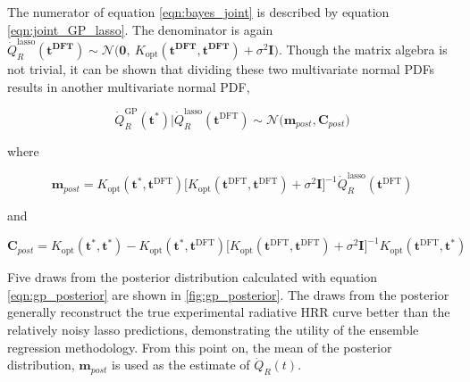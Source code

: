 \documentclass{article}
\begin{document}
The numerator of equation \ref{eqn:bayes_joint} is described by equation \ref{eqn:joint_GP_lasso}. The denominator is again $\dot{Q}_{R}^{\text{lasso}}(\boldsymbol{t^{\text{DFT}}}) \sim \mathcal{N}\Big(\boldsymbol{0}, \ K_{\text{opt}}( \boldsymbol{t^{\text{DFT}}}, \boldsymbol{t^{\text{DFT}}}) + \sigma^2\boldsymbol{I} \Big)$. Though the matrix algebra is not trivial, it can be shown that dividing these two multivariate normal PDFs results in another multivariate normal PDF,

\begin{equation}
  \label{eqn:gp_posterior}
 \dot{Q}_{R}^{\text{GP}}(\boldsymbol{t}^*)  \Big| \dot{Q}_{R}^{\text{lasso}}(\boldsymbol{t}^{\text{DFT}}) \sim 
 \mathcal{N}\Big(\boldsymbol{m}_{post}, \boldsymbol{C}_{post}\Big)
\end{equation}

\noindent where

$$
\boldsymbol{m}_{post} = K_{\text{opt}}(\boldsymbol{t}^*, \boldsymbol{t}^{\text{DFT}})\Big[K_{\text{opt}}(\boldsymbol{t}^{\text{DFT}}, \boldsymbol{t}^{\text{DFT}}) + \sigma^2\boldsymbol{I}\Big]^{-1} \dot{Q}_{R}^{\text{lasso}}(\boldsymbol{t}^{\text{DFT}})
$$

\noindent and 

$$
\boldsymbol{C}_{post} = K_{\text{opt}}(\boldsymbol{t}^*, \boldsymbol{t}^*) -  K_{\text{opt}}( \boldsymbol{t}^*, \boldsymbol{t}^{\text{DFT}})\Big[K_{\text{opt}}(\boldsymbol{t}^{\text{DFT}}, \boldsymbol{t}^{\text{DFT}}) + \sigma^2\boldsymbol{I}\Big]^{-1}K_{\text{opt}}(\boldsymbol{t}^{\text{DFT}},\boldsymbol{t}^*)
$$


Five draws from the posterior distribution calculated with equation \ref{eqn:gp_posterior} are shown in \ref{fig:gp_posterior}. The draws from the posterior generally reconstruct the true experimental radiative HRR curve better than the relatively noisy lasso predictions, demonstrating the utility of the ensemble regression methodology. From this point on, the mean of the posterior distribution, $\boldsymbol{m}_{post}$ is used as the estimate of $\dot{Q}_R(t)$. 
\end{document}
